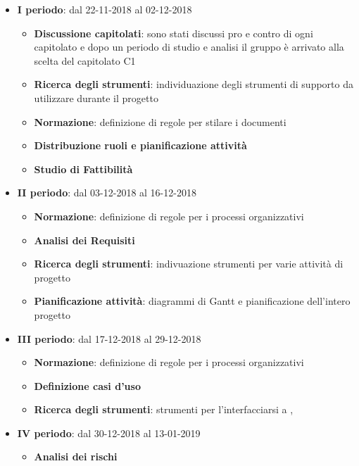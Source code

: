 		\begin{itemize}
			\item \textbf{I periodo}: dal 22-11-2018 al 02-12-2018
			\begin{itemize}
    	        \item \textbf{Discussione capitolati}: sono stati discussi pro e contro di ogni capitolato e dopo un periodo di
    	        studio e analisi il gruppo è arrivato alla scelta del capitolato C1 
    	        \item \textbf{Ricerca degli strumenti}: individuazione degli strumenti di supporto da utilizzare durante il progetto
    	        \item \textbf{Normazione}: definizione di regole per stilare i documenti
    	        \item \textbf{Distribuzione ruoli e pianificazione attività}
       	        \item \textbf{Studio di Fattibilità}
        	\end{itemize}
			\item \textbf{II periodo}: dal 03-12-2018 al 16-12-2018
			\begin{itemize}
    	        \item \textbf{Normazione}: definizione di regole per i processi organizzativi
    	        \item \textbf{Analisi dei Requisiti}
       	        \item \textbf{Ricerca degli strumenti}: indivuazione strumenti per varie attività di progetto
       	        \item \textbf{Pianificazione attività}: diagrammi di Gantt e pianificazione dell'intero progetto
        	\end{itemize}
        	\item \textbf{III periodo}: dal 17-12-2018 al 29-12-2018
			\begin{itemize}
    	        \item \textbf{Normazione}: definizione di regole per i processi organizzativi
    	        \item \textbf{Definizione casi d'uso}
       	        \item \textbf{Ricerca degli strumenti}: strumenti per l'interfacciarsi a , 
        	\end{itemize}
        	\item \textbf{IV periodo}: dal 30-12-2018 al 13-01-2019
        	\begin{itemize}
    	        \item \textbf{Analisi dei rischi}

\end{itemize}
\end{itemize}
